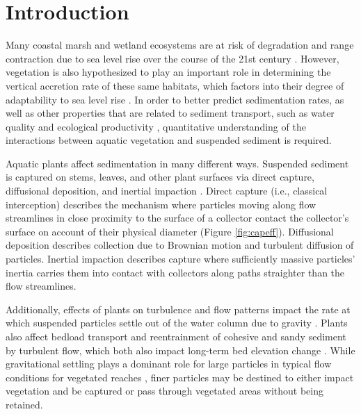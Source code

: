 \documentclass[geosciences,article,submit,moreauthors,pdftex]{Definitions/mdpi}
\begin{document}
\section{Introduction}

Many coastal marsh and wetland ecosystems are at risk of degradation and range contraction due to sea level rise over the course of the 21st century \cite{thorne2018us,jankowski2017vulnerability}. However, vegetation is also hypothesized to play an important role in determining the vertical accretion rate of these same habitats, which factors into their degree of adaptability to sea level rise \cite{kirwan2010limits}. In order to better predict sedimentation rates, as well as other properties that are related to sediment transport, such as water quality \cite{goodwin2003temporal} and ecological productivity \cite{kirwan2007coupled}, quantitative understanding of the interactions between aquatic vegetation and suspended sediment is required.

Aquatic plants affect sedimentation in many different ways. Suspended sediment is captured on stems, leaves, and other plant surfaces \cite{stumpf1983process,leonard1995flow,mudd2010does} via direct capture, diffusional deposition, and inertial impaction \cite{Fauria_2015, spielman1977particle,rubenstein1977mechanisms}. Direct capture (i.e., classical interception) describes the mechanism where particles moving along flow streamlines in close proximity to the surface of a collector contact the collector's surface on account of their physical diameter (Figure \ref{fig:capeff}). Diffusional deposition describes collection due to Brownian motion and turbulent diffusion of particles. Inertial impaction describes capture where sufficiently massive particles' inertia carries them into contact with collectors along paths straighter than the flow streamlines.

Additionally, effects of plants on turbulence and flow patterns impact the rate at which suspended particles settle out of the water column due to gravity \cite{christiansen2000flow, leonard1995flow, Nielsen_1993, Jacobs_2016, Wang_2018, mudd2010does}. Plants also affect bedload transport \cite{yager2013influence, yang2019impact, jordanova2003experimental} and reentrainment of cohesive \cite{d2007landscape} and sandy \cite{tinoco2018turbulence} sediment by turbulent flow, which both also impact long-term bed elevation change \cite{wu2005depth,d2007landscape}. While gravitational settling plays a dominant role for large particles in typical flow conditions for vegetated reaches \cite{mudd2010does, leonard1995flow}, finer particles may be destined to either impact vegetation and be captured or pass through vegetated areas without being retained.
\end{document}
